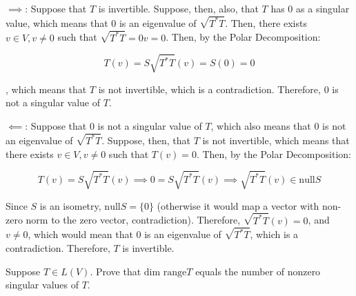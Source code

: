 \begin{solution}

    $\implies$: Suppose that $T$ is invertible. Suppose, then, also, that $T$ has 0 as a singular value, which means that 0 is an eigenvalue of $\sqrt{T^*T}$. Then, there exists $v \in V, v \neq 0$ such that $\sqrt{T^*T} = 0v = 0$. Then, by the Polar Decomposition:

    $$T(v) = S\sqrt{T^*T}(v) = S(0) = 0$$

    , which means that $T$ is not invertible, which is a contradiction. Therefore, 0 is not a singular value of $T$.

    $\impliedby$: Suppose that 0 is not a singular value of $T$, which also means that 0 is not an eigenvalue of $\sqrt{T^*T}$. Suppose, then, that $T$ is not invertible, which means that there exists $v \in V, v \neq 0$ such that $T(v) = 0$. Then, by the Polar Decomposition:

    $$T(v) = S\sqrt{T^*T}(v) \implies 0 = S\sqrt{T^*T}(v) \implies \sqrt{T^*T}(v) \in \text{null} S$$

    Since $S$ is an isometry, $\text{null} S = \{0\}$ (otherwise it would map a vector with non-zero norm to the zero vector, contradiction). Therefore, $\sqrt{T^*T}(v) = 0$, and $v \neq 0$, which would mean that 0 is an eigenvalue of $\sqrt{T^*T}$, which is a contradiction. Therefore, $T$ is invertible.
\end{solution}

\begin{exercise}{14}
    Suppose $T \in L(V)$. Prove that $\text{dim range} T$ equals the number of nonzero singular values of $T$.
\end{exercise}

